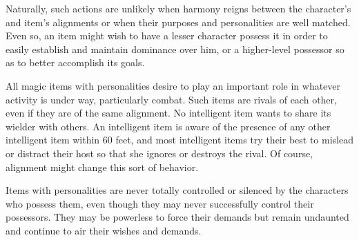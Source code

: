 Naturally, such actions are unlikely when harmony reigns between the character's and item's alignments or when their purposes and personalities are well matched. Even so, an item might wish to have a lesser character possess it in order to easily establish and maintain dominance over him, or a higher-level possessor so as to better accomplish its goals.

All magic items with personalities desire to play an important role in whatever activity is under way, particularly combat. Such items are rivals of each other, even if they are of the same alignment. No intelligent item wants to share its wielder with others. An intelligent item is aware of the presence of any other intelligent item within 60 feet, and most intelligent items try their best to mislead or distract their host so that she ignores or destroys the rival. Of course, alignment might change this sort of behavior.

Items with personalities are never totally controlled or silenced by the characters who possess them, even though they may never successfully control their possessors. They may be powerless to force their demands but remain undaunted and continue to air their wishes and demands.
